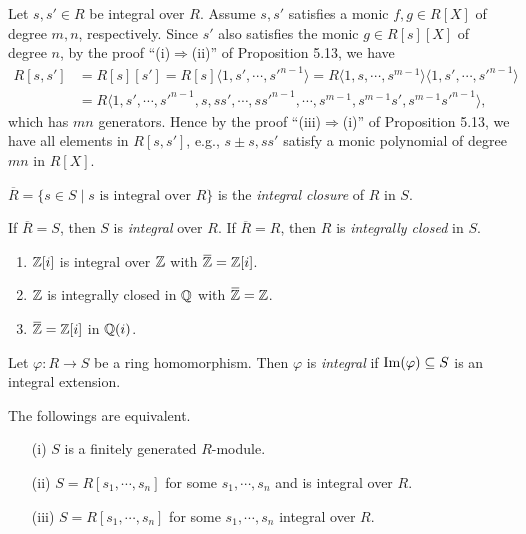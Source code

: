 \begin{note*}
    Let $s,s' \in R$ be integral over $R$. Assume $s,s'$ satisfies a monic $f,g \in R[X]$ of degree $m,n$, respectively. Since $s'$ also satisfies the monic $g \in R[s][X]$ of degree $n$, by the proof ``(i)$\Rightarrow$(ii)'' of Proposition 5.13, we have
    \begin{align*}
        R[s,s'] &= R[s][s'] = R[s]\langle 1,s',\cdots,s'^{n-1} \rangle = R\langle 1,s,\cdots,s^{m-1} \rangle \langle 1,s',\cdots,s'^{n-1} \rangle \\
        &= R\langle 1,s',\cdots,s'^{n-1},s,ss',\cdots,ss'^{n-1},\cdots,s^{m-1},s^{m-1}s',s^{m-1}s'^{n-1} \rangle,
    \end{align*}
    which has $mn$ generators. Hence by the proof ``(iii)$\Rightarrow$(i)'' of Proposition 5.13, we have all elements in $R[s,s']$, e.g., $s \pm s,ss'$ satisfy a monic polynomial of degree $mn$ in $R[X]$.
\end{note*}

\begin{definition}
    $\overbar{R} = \{s \in S \mid s \text{ is integral over }R\}$ is the \emph{integral closure} of $R$ in $S$. \par 
    If $\overbar{R} = S$, then $S$ is \emph{integral} over $R$. If $\overbar{R} = R$, then $R$ is \emph{integrally closed} in $S$.
\end{definition}

\begin{example}
    \begin{enumerate}
        \item $\mathbb{Z}[i]$ is integral over $\mathbb{Z}$ with $\overbar{\bbZ} = \bbZ[i]$.
        \item $\mathbb{Z}$ is integrally closed in $\mathbb{Q}$ with $\overbar{\bbZ} = \bbZ$. 
        \item $\overbar{\bbZ} = \bbZ[i]$ in $\mathbb{Q}(i)$.
    \end{enumerate}
\end{example}

\begin{definition}
    Let $\varphi: R \to S$ be a ring homomorphism. Then $\varphi$ is \emph{integral} if $\operatorname{Im}(\varphi) \subseteq S$ is an integral extension.
\end{definition}

\begin{theorem}
    The followings are equivalent.
    \begin{enumerate}
        \item[(i)]
            $S$ is a finitely generated $R$-module.
        \item[(ii)]
            $S = R[s_1,\cdots,s_n]$ for some $s_1,\cdots,s_n$ and is integral over $R$. 
        \item[(iii)] $S = R[s_1,\cdots,s_n]$ for some $s_1,\cdots,s_n$ integral over $R$.
    \end{enumerate}
\end{theorem}

